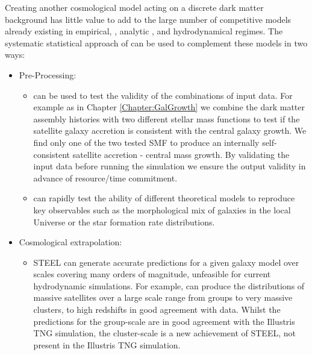 Creating another cosmological model acting on a discrete dark matter background has little value to add to the large number of competitive models already existing in empirical, \cite[e.g.][]{Rodriguez-Puebla2017ConstrainingProperties, Moster2018Emerge10, Behroozi2019UniverseMachine:010, Zavala2012}, analytic \cite[e.g.][]{Somerville2015StarGas, Guo2011FromCosmology, Fontanot2007ReproducingCosmogony, Zoldan2019TheEvolution}, and hydrodynamical \cite[e.g.][]{Springel2018FirstClustering, Hopkins2018FIRE-2Formation, McAlpine2015TheCatalogues} regimes. The systematic statistical approach of \steel can be used to complement these models in two ways:
\begin{itemize}
    \item Pre-Processing: 
    \begin{itemize}
        \item \steel can be used to test the validity of the combinations of input data. For example as in Chapter \ref{Chapter:GalGrowth} we combine the dark matter assembly histories with two different stellar mass functions to test if the satellite galaxy accretion is consistent with the central galaxy growth. We find only one of the two tested SMF to produce an internally self-consistent satellite accretion - central mass growth. By validating the input data before running the simulation we ensure the output validity in advance of resource/time commitment.
        \item \steel can rapidly test the ability of different theoretical models to reproduce key observables such as the morphological mix of galaxies in the local Universe or the star formation rate distributions. 
    \end{itemize}
    \item Cosmological extrapolation: 
    \begin{itemize}
        \item STEEL can generate accurate predictions for a given galaxy model over scales covering many orders of magnitude, unfeasible for current hydrodynamic simulations. For example, \steel can produce the distributions of massive satellites over a large scale range from groups to very massive clusters, to high redshifts in good agreement with data. Whilst the predictions for the group-scale are in good agreement with the Illustris TNG simulation, the cluster-scale is a new achievement of STEEL, not present in the Illustris TNG simulation.
    \end{itemize}
\end{itemize}
